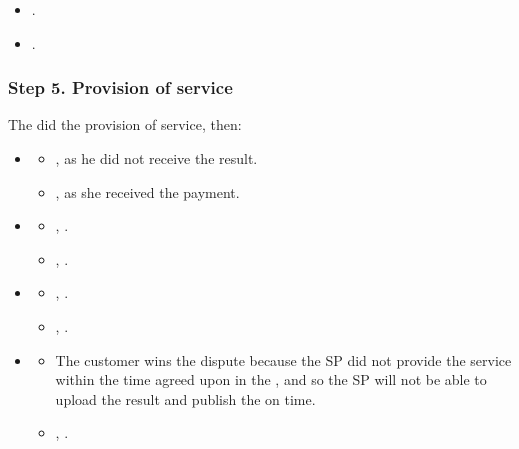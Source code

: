 \documentclass[pdftex,twocolumn,epjc3]{svjour3}
\begin{document}
{\begin{itemize}
  \item {}.
  \item {}.
\end{itemize}



\subsubsection*{Step 5. \SPTurn{} Provision of service}

The \sp{} did the provision of service, then:

\begin{itemize}
\item \AgreeablePath
  \begin{itemize}
    \item {},  as he did not receive the result.
    \item {},  as she received the payment.
  \end{itemize}
\item \DisputePath
  \begin{itemize}
    \item {}, \CustomerLosesBeforePoP{}.
    \item {}, .
  \end{itemize}
\end{itemize}

\ActedAbnormallyThen{\sp}

\begin{itemize}
\item \AgreeablePath
  \begin{itemize}
    \item {}, \CustomerPaidButDidntGetResult{}. 
    \item {}, \SpReceivedThePayment{}.
  \end{itemize}
\item \DisputePath
  \begin{itemize}
    \item {} The customer wins the dispute because the SP did not provide the service within the time agreed upon in the \PoD{}, and so the SP will not be able to upload the result and publish the \PoP{} on time.
    \item {}, .
  \end{itemize}
\end{itemize}

}
\end{document}
